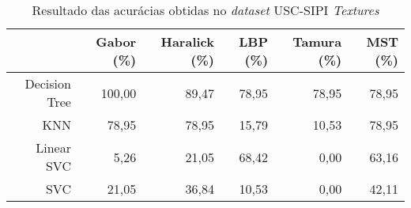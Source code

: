 \begin{table}[H]
    \centering
    \caption[Resultado das acurácias obtidas no \textit{dataset} USC-SIPI \textit{Textures}]{Resultado das acurácias obtidas no \textit{dataset} USC-SIPI \textit{Textures}
    \label{tab:uscSipiAcuracias}}
    \begin{tabular}{rrrrrr}
        \toprule
            & Gabor (\%) & Haralick (\%) & LBP (\%) & Tamura (\%) & MST (\%) \\
        \midrule
            Decision Tree & 100,00 & 89,47 & 78,95 & 78,95 & 78,95 \\
            KNN & 78,95 & 78,95 & 15,79 & 10,53 & 78,95 \\
            Linear SVC & 5,26 & 21,05 & 68,42 & 0,00 & 63,16 \\
            SVC & 21,05 & 36,84 & 10,53 & 0,00 & 42,11 \\
        \bottomrule
    \end{tabular}
\end{table}
